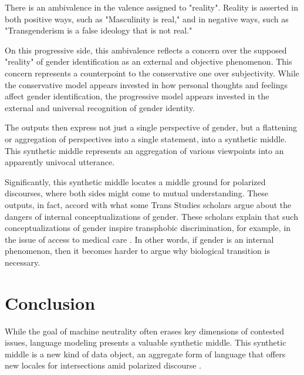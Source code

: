 \documentclass{article}
\begin{document}
There is an ambivalence in the valence assigned to "reality". Reality is asserted in both positive ways, such as "Masculinity is real," and in negative ways, such as "Transgenderism is a false ideology that is not real." 

On this progressive side, this ambivalence reflects a concern over the supposed "reality" of gender identification as an external and objective phenomenon. This concern represents a counterpoint to the conservative one over subjectivity. While the conservative model appears invested in how personal thoughts and feelings affect gender identification, the progressive model appears invested in the external and universal recognition of gender identity.

The outputs then express not just a single perspective of gender, but a flattening or aggregation of perspectives into a single statement, into a synthetic middle. This synthetic middle represents an aggregation of various viewpoints into an apparently univocal utterance. 

Significantly, this synthetic middle locates a middle ground for polarized discourses, where both sides might come to mutual understanding. These outputs, in fact, accord with what some Trans Studies scholars argue about the dangers of internal conceptualizations of gender. These scholars explain that such conceptualizations of gender inspire transphobic discrimination, for example, in the issue of access to medical care \citep{amin_2022,chu_2024}. In other words, if gender is an internal phenomenon, then it becomes harder to argue why biological transition is necessary. 

\section{Conclusion}

While the goal of machine neutrality often erases key dimensions of contested issues, language modeling presents a valuable synthetic middle. This synthetic middle is a new kind of data object, an aggregate form of language that offers new locales for intersections amid polarized discourse \citep{konya_2025}.

\begin{ack}

\end{ack}




\end{document}

